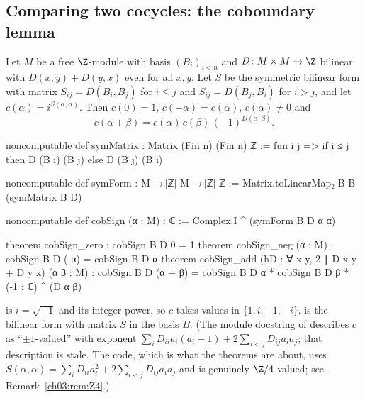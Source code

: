 \subsection{Comparing two cocycles: the coboundary lemma}

\begin{lemma}\label{ch03:lem:cobSign}
Let $M$ be a free $\Z$-module with basis $(B_i)_{i<n}$ and $D\colon M\times M\to\Z$ bilinear with
$D(x,y)+D(y,x)$ even for all $x,y$. Let $S$ be the symmetric bilinear form with matrix
$S_{ij}=D(B_i,B_j)$ for $i\le j$ and $S_{ij}=D(B_j,B_i)$ for $i>j$, and let
$c(\alpha)=i^{S(\alpha,\alpha)}$. Then $c(0)=1$, $c(-\alpha)=c(\alpha)$, $c(\alpha)\neq0$ and
\begin{equation}\label{ch03:eq:cob}
  c(\alpha+\beta)=c(\alpha)\,c(\beta)\,(-1)^{D(\alpha,\beta)} .
\end{equation}
\end{lemma}
\begin{leancode}
noncomputable def symMatrix : Matrix (Fin n) (Fin n) ℤ :=
  fun i j => if i ≤ j then D (B i) (B j) else D (B j) (B i)

noncomputable def symForm : M →ₗ[ℤ] M →ₗ[ℤ] ℤ := Matrix.toLinearMap₂ B B (symMatrix B D)

noncomputable def cobSign (α : M) : ℂ := Complex.I ^ (symForm B D α α)

theorem cobSign_zero : cobSign B D 0 = 1
theorem cobSign_neg (α : M) : cobSign B D (-α) = cobSign B D α
theorem cobSign_add (hD : ∀ x y, 2 ∣ D x y + D y x) (α β : M) :
    cobSign B D (α + β) = cobSign B D α * cobSign B D β * (-1 : ℂ) ^ (D α β)
\end{leancode}
\begin{dictionary}
 is $i=\sqrt{-1}$ and  its integer power, so $c$ takes
values in $\{1,i,-1,-i\}$.  is the bilinear form with matrix $S$
in the basis $B$. (The module docstring of  describes $c$ as
``$\pm1$-valued'' with exponent $\sum_iD_{ii}a_i(a_i-1)+2\sum_{i<j}D_{ij}a_ia_j$; that description is
stale. The code, which is what the theorems are about, uses $S(\alpha,\alpha)=\sum_iD_{ii}a_i^2+
2\sum_{i<j}D_{ij}a_ia_j$ and is genuinely $\Z/4$-valued; see Remark~\ref{ch03:rem:Z4}.)
\end{dictionary}

